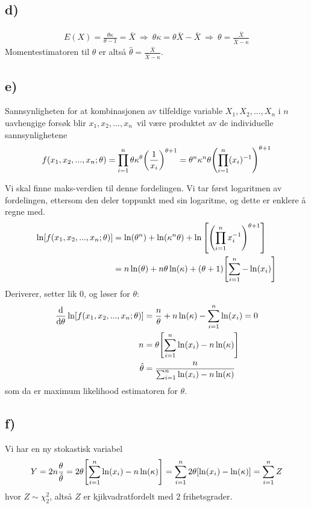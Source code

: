 \documentclass[12p,a4paper]{article}
\begin{document}
\subsection*{d)}
\begin{align*}
    E(X) = \frac{\theta\kappa}{\theta - 1} = \bar{X} \ \Rightarrow \ 
    \theta\kappa = \theta\bar{X} - \bar{X} \ \Rightarrow \ 
    \theta = \frac{\bar{X}}{\bar{X} - \kappa}
\end{align*}
Momentestimatoren til $\theta$ er altså $\hat{\theta} = \frac{\bar{X}}{\bar{X} - \kappa}$.


\subsection*{e)}
Sannsynligheten for at kombinasjonen av tilfeldige variable $X_1, X_2,...,X_n$ i $n$ uavhengige forsøk blir $x_1, x_2,...,x_n$ vil være produktet av de individuelle sannsynlighetene
\begin{align*}
    f(x_1, x_2, ..., x_n; \theta) = \prod_{i=1}^n \theta\kappa^\theta\qty(\frac{1}{x_i})^{\theta+1} = \theta^n\kappa^n\theta \qty(\prod_{i=1}^n (x_i)^{-1})^{\theta+1}
\end{align*}

Vi skal finne maks-verdien til denne fordelingen. Vi tar først logaritmen av fordelingen, ettersom den deler toppunkt med sin logaritme, og dette er enklere å regne med.
\begin{align*}
    \ln[f(x_1, x_2, ..., x_n; \theta)]
    &= \ln(\theta^n) + \ln(\kappa^n\theta) + \ln\qty[\qty(\prod_{i=1}^n x_i^{-1})^{\theta+1}] \\
    &= n\ln(\theta) + n\theta\ln(\kappa) + (\theta + 1)\qty[ \sum_{i=1}^n -\ln(x_i) ]
\end{align*}
Deriverer, setter lik 0, og løser for $\theta$:
\begin{align*}
    \dv{\theta} \ln[f(x_1, x_2, ..., x_n; \theta)] &= \frac{n}{\theta} + n\ln(\kappa) - \sum_{i=1}^n \ln(x_i) = 0 \\
    n &= \theta\qty[\sum_{i=1}^n \ln(x_i) - n\ln(\kappa)] \\
    \hat{\theta} &= \frac{n}{\sum_{i=1}^n \ln(x_i) - n\ln(\kappa)}
\end{align*}
som da er maximum likelihood estimatoren for $\theta$.


\subsection*{f)}
Vi har en ny stokastisk variabel
\begin{align*}
    Y = 2n\frac{\theta}{\hat{\theta}} = 2\theta\qty[\sum_{i=1}^n \ln(x_i) - n\ln(\kappa)] = \sum_{i=1}^n 2\theta\qty[\ln(x_i) - \ln(\kappa)] = \sum_{i=1}^n Z
\end{align*}
hvor $Z \sim \chi_2^2$, altså $Z$ er kjikvadratfordelt med 2 frihetsgrader.
\end{document}
